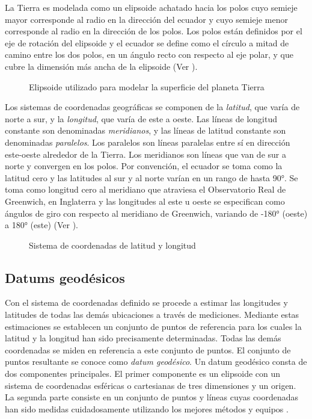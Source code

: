 La Tierra es modelada como un elipsoide achatado hacia los polos cuyo semieje mayor corresponde al radio en la dirección del ecuador y cuyo semieje menor corresponde al radio en la dirección de los polos. Los polos están definidos por el eje de rotación del elipsoide y el ecuador se define como el círculo a mitad de camino entre los dos polos, en un ángulo recto con respecto al eje polar, y que cubre la dimensión más ancha de la elipsoide (Ver ).

\begin{figure}[h]
	\centering
	
	\caption[Elipsoide que modela la superficie de la Tierra]{Elipsoide utilizado para modelar la superficie del planeta Tierra}
	\label{fig:elipsoide} 
\end{figure}

Los sistemas de coordenadas geográficas se componen de la \emph{latitud}, que varía de norte a sur, y la \emph{longitud}, que varía de este a oeste. Las líneas de longitud constante son denominadas \emph{meridianos}, y las líneas de latitud constante son denominadas \emph{paralelos}. Los paralelos son líneas paralelas entre sí en dirección este-oeste alrededor de la Tierra. Los meridianos son líneas que van de sur a norte y convergen en los polos. Por convención, el ecuador se toma como la latitud cero y las latitudes al sur y al norte varían en un rango de hasta 90°. Se toma como longitud cero al meridiano que atraviesa el Observatorio Real de Greenwich, en Inglaterra y las longitudes al este u oeste se especifican como ángulos de giro con respecto al meridiano de Greenwich, variando de -180° (oeste) a 180° (este) (Ver ).

\begin{figure}[h]
	\centering
	
	\caption[Sistema de coordenadas de latitud y longitud]{Sistema de coordenadas de latitud y longitud}
	\label{fig:coordenadas} 
\end{figure}

\subsection{Datums geodésicos}


Con el sistema de coordenadas definido se procede a estimar las longitudes y latitudes de todas las demás ubicaciones a través de mediciones. Mediante estas estimaciones se establecen un conjunto de puntos de referencia para los cuales la latitud y la longitud han sido precisamente determinadas. Todas las demás coordenadas se miden en referencia a este conjunto de puntos. El conjunto de puntos resultante se conoce como \emph{datum geodésico}.  Un datum geodésico consta de dos componentes principales. El primer componente es un elipsoide con un sistema de coordenadas esféricas o cartesianas de tres dimensiones y un origen. La segunda parte consiste en un conjunto de puntos y líneas cuyas coordenadas han sido medidas cuidadosamente utilizando los mejores métodos y equipos \cite{bolstad2005gis}.

